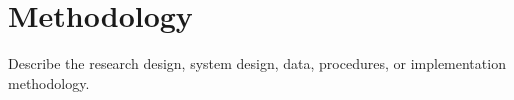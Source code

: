 \section{Methodology}
\label{sec:methodology}

Describe the research design, system design, data, procedures, or implementation methodology.
